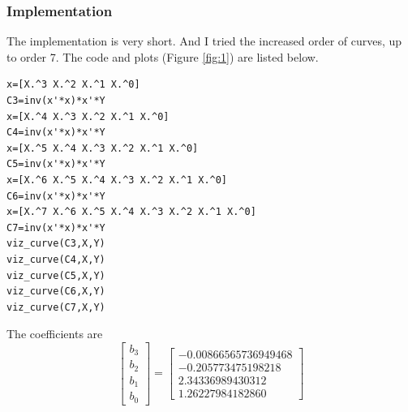 \subsubsection{Implementation}
The implementation is very short.
And I tried the increased order of curves, up to order 7.
The code and plots (Figure \ref{fig:1}) are listed below.
\begin{lstlisting}[style=Matlab-editor]
x=[X.^3 X.^2 X.^1 X.^0]
C3=inv(x'*x)*x'*Y
x=[X.^4 X.^3 X.^2 X.^1 X.^0]
C4=inv(x'*x)*x'*Y
x=[X.^5 X.^4 X.^3 X.^2 X.^1 X.^0]
C5=inv(x'*x)*x'*Y
x=[X.^6 X.^5 X.^4 X.^3 X.^2 X.^1 X.^0]
C6=inv(x'*x)*x'*Y
x=[X.^7 X.^6 X.^5 X.^4 X.^3 X.^2 X.^1 X.^0]
C7=inv(x'*x)*x'*Y
viz_curve(C3,X,Y)
viz_curve(C4,X,Y)
viz_curve(C5,X,Y)
viz_curve(C6,X,Y)
viz_curve(C7,X,Y)
\end{lstlisting}

The coefficients are
\begin{equation}
\begin{bmatrix}
b_3 \\ b_2 \\ b_1 \\ b_0
\end{bmatrix}
=
\begin{bmatrix}
	-0.00866565736949468\\
	-0.205773475198218\\
	2.34336989430312\\
	1.26227984182860
\end{bmatrix}
\end{equation}


